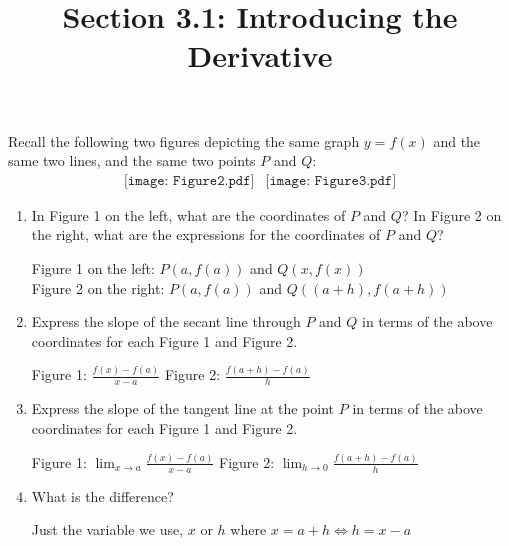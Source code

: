 \documentclass[nooutcomes,handout]{ximera}
\title{Section 3.1: Introducing the Derivative}
\begin{document}
\begin{abstract}		\end{abstract}
\maketitle

\begin{problem}
 Recall the following two figures depicting the same graph $y=f(x)$ and the same two lines, and the same two points $P$ and $Q$:
  \[
    \begin{array}{lr}
      \texttt{[image: Figure2.pdf]} &		   \texttt{[image: Figure3.pdf]}
    \end{array}
  \]
  \begin{enumerate}
    \item
      In Figure 1 on the left, what are the coordinates of $P$ and $Q$?  In Figure 2 on the right, what are the expressions for the coordinates of $P$ and $Q$?

	\begin{freeResponse}
	Figure 1 on the left: $P(a,f(a))$ and $Q(x,f(x))$ \\
	Figure 2 on the right: $P(a,f(a))$ and $Q((a+h),f(a+h))$

	\end{freeResponse}

	\item Express the slope of the secant line through $P$ and $Q$ in terms of the above coordinates for each Figure 1 and Figure 2.

      \begin{freeResponse}
	Figure 1: $\frac{f(x)-f(a)}{x-a}$ \quad
	Figure 2: $\frac{f(a+h)-f(a)}{h}$
        \end{freeResponse}
	
	\item
	Express the slope of the tangent line at the point $P$ in terms of the above coordinates for each Figure 1 and Figure 2.

	\begin{freeResponse}
        	Figure 1:  $ \lim_{x \to a} \frac{f(x)-f(a)}{x-a}$\quad
	Figure 2: $\lim_{h \to 0} \frac{f(a+h)-f(a)}{h}$
      \end{freeResponse}

    \item 
      What is the difference?
      \begin{freeResponse}
	Just the variable we use, $x$ or $h$ where $x=a+h \iff h=x-a$
      \end{freeResponse}



\end{enumerate}
\end{problem}
\end{document}

